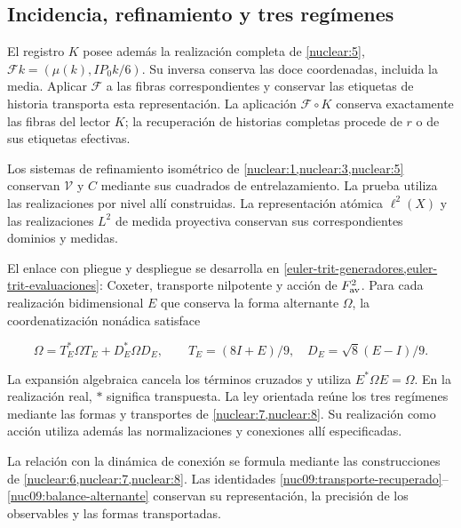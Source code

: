 \subsection{Incidencia, refinamiento y tres regímenes}

El registro \(K\) posee además la realización completa de
\cref{nuclear:5},
\(\mathcal Fk=(\mu(k),IP_0k/6)\).
Su inversa conserva las doce coordenadas, incluida la media.
Aplicar \(\mathcal F\) a las fibras correspondientes y conservar
las etiquetas de historia transporta esta representación.
La aplicación \(\mathcal F\circ K\) conserva exactamente las fibras
del lector \(K\); la recuperación de historias completas procede
de \(r\) o de sus etiquetas efectivas.

Los sistemas de refinamiento isométrico de
\cref{nuclear:1,nuclear:3,nuclear:5} conservan
\(\mathcal V\) y \(C\) mediante sus cuadrados de entrelazamiento.
La prueba utiliza las realizaciones por nivel allí construidas.
La representación atómica \(\ell^2(X)\) y las realizaciones
\(L^2\) de medida proyectiva conservan sus correspondientes
dominios y medidas.

El enlace con pliegue y despliegue se desarrolla en
\cref{euler-trit-generadores,euler-trit-evaluaciones}:
Coxeter, transporte nilpotente y acción de \(F_{\rm av}^2\).
Para cada realización bidimensional \(E\) que conserva la forma
alternante \(\Omega\), la coordenatización nonádica satisface



\begin{equation}
\Omega=T_E^*\Omega T_E+D_E^*\Omega D_E,
\qquad T_E=(8I+E)/9,\quad D_E=\sqrt8(E-I)/9.
\label{nuc09:balance-alternante}
\end{equation}



La expansión algebraica cancela los términos cruzados y utiliza
\(E^*\Omega E=\Omega\). En la realización real,
\(*\) significa transpuesta.
La ley orientada reúne los tres regímenes mediante las formas
y transportes de \cref{nuclear:7,nuclear:8}.
Su realización como acción utiliza además las normalizaciones
y conexiones allí especificadas.

La relación con la dinámica de conexión se formula mediante
las construcciones de \cref{nuclear:6,nuclear:7,nuclear:8}.
Las identidades
\eqref{nuc09:transporte-recuperado}--\eqref{nuc09:balance-alternante}
conservan su representación, la precisión de los observables
y las formas transportadas.
